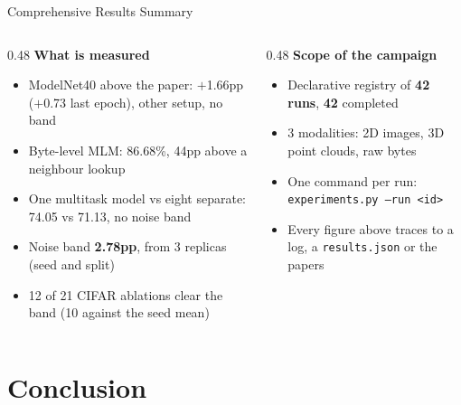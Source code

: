 \documentclass[aspectratio=169,11pt]{beamer}
\begin{document}
\begin{frame}[shrink=28]{Comprehensive Results Summary}
  \vspace{0.4em}
  \begin{columns}[T]
    \begin{column}{0.48\textwidth}
      \textbf{What is measured}
      \begin{itemize}\small
        \item ModelNet40 above the paper: $+$1.66pp ($+$0.73 last epoch), other setup, no band
        \item Byte-level MLM: 86.68\%, 44pp above a neighbour lookup
        \item One multitask model vs eight separate: 74.05 vs 71.13, no noise band
        \item Noise band \textbf{2.78pp}, from 3 replicas (seed and split)
        \item 12 of 21 CIFAR ablations clear the band (10 against the seed mean)
      \end{itemize}
    \end{column}
    \begin{column}{0.48\textwidth}
      \textbf{Scope of the campaign}
      \begin{itemize}\small
        \item Declarative registry of \textbf{42 runs}, \textbf{42} completed
        \item 3 modalities: 2D images, 3D point clouds, raw bytes
        \item One command per run: \texttt{experiments.py --run <id>}
        \item Every figure above traces to a log, a \texttt{results.json} or the papers
      \end{itemize}
    \end{column}
  \end{columns}
\end{frame}

\section{Conclusion}
\end{document}
